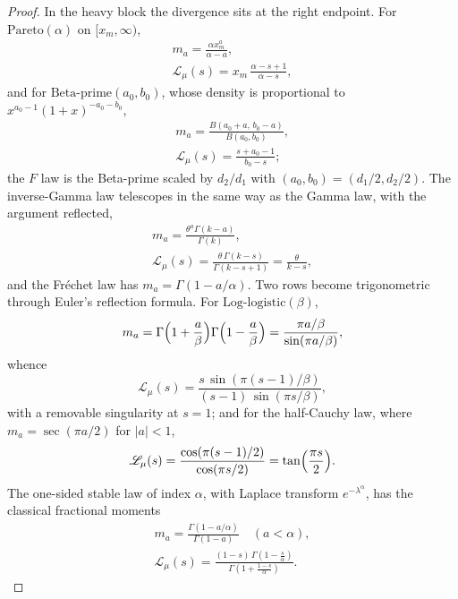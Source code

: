 \documentclass[sn-mathphys-num]{sn-jnl}
\theoremstyle{thmstyleone}%
\theoremstyle{thmstyletwo}%
\theoremstyle{thmstylethree}%
\theoremstyle{thmstyleone}%
\providecommand{\Leh}{\mathscr{L}}
\begin{document}
\begin{appendices}
\begin{proof}
			In the heavy block the divergence sits at the right endpoint.
			For $\mathrm{Pareto}(\alpha)$ on $[x_m,\infty)$,
			\begin{equation}\label{eq:dictPareto}
				\begin{gathered}
					m_a=\frac{\alpha x_m^a}{\alpha-a},\\
					\Leh_\mu(s)=x_m\,\frac{\alpha-s+1}{\alpha-s} ,
				\end{gathered}
			\end{equation}
			and for $\mathrm{Beta\text{-}prime}(a_0,b_0)$, whose density is
			proportional to $x^{a_0-1}(1+x)^{-a_0-b_0}$,
			\begin{equation}\label{eq:dictBetaPrime}
				\begin{gathered}
					m_a=\frac{B(a_0+a,\,b_0-a)}{B(a_0,b_0)},\\
					\Leh_\mu(s)=\frac{s+a_0-1}{b_0-s} ;
				\end{gathered}
			\end{equation}
			the $F$ law is the Beta-prime scaled by $d_2/d_1$ with
			$(a_0,b_0)=(d_1/2,d_2/2)$. The inverse-Gamma law telescopes in
			the same way as the Gamma law, with the argument reflected,
			\begin{equation}\label{eq:invgamma}
				\begin{gathered}
					m_a=\frac{\theta^a\Gamma(k-a)}{\Gamma(k)},\\
					\Leh_\mu(s)=\frac{\theta\,\Gamma(k-s)}{\Gamma(k-s+1)}
					=\frac{\theta}{k-s} ,
				\end{gathered}
			\end{equation}
			and the Fr\'echet law has $m_a=\Gamma(1-a/\alpha)$. Two rows
			become trigonometric through Euler's reflection formula. For
			$\mathrm{Log\text{-}logistic}(\beta)$,
			\begin{equation}\label{eq:loglogistic}
				m_a=\Gamma\Bigl(1+\frac a\beta\Bigr)
				\Gamma\Bigl(1-\frac a\beta\Bigr)
				=\frac{\pi a/\beta}{\sin(\pi a/\beta)},
			\end{equation}
			whence
			\begin{equation}\label{eq:loglogisticL}
				\Leh_\mu(s)=\frac{s\,\sin(\pi(s-1)/\beta)}
				{(s-1)\,\sin(\pi s/\beta)},
			\end{equation}
			with a removable singularity at $s=1$; and for the half-Cauchy
			law, where $m_a=\sec(\pi a/2)$ for $|a|<1$,
			\begin{equation}\label{eq:halfcauchyL}
				\Leh_\mu(s)=\frac{\cos(\pi(s-1)/2)}{\cos(\pi s/2)}
				=\tan\Bigl(\frac{\pi s}{2}\Bigr).
			\end{equation}
			The one-sided stable law of index $\alpha$, with Laplace
			transform $e^{-\lambda^\alpha}$, has the classical fractional
			moments
			\begin{equation}\label{eq:dictStable}
				\begin{gathered}
					m_a=\frac{\Gamma(1-a/\alpha)}{\Gamma(1-a)}
					\quad(a<\alpha),\\
					\Leh_\mu(s)=\frac{(1-s)\,\Gamma(1-\tfrac s\alpha)}
					{\Gamma(1+\tfrac{1-s}\alpha)} .
				\end{gathered}
			\end{equation}
			

\end{proof}
\end{appendices}
\end{document}
